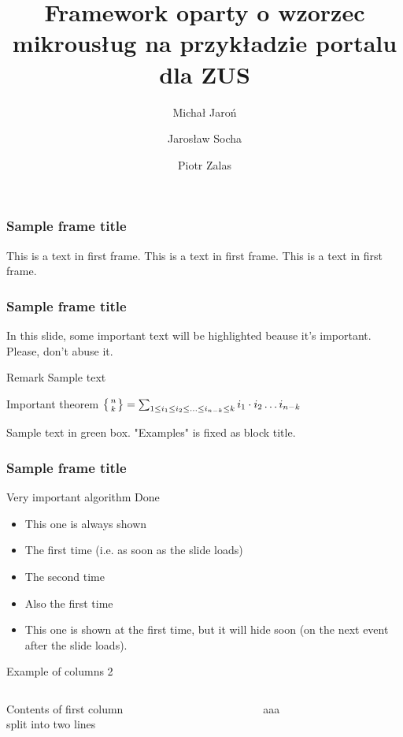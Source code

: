 \documentclass{beamer}
\title[ZPP] %
{Framework oparty o wzorzec mikrousług na przykładzie portalu dla ZUS}
\subtitle{}
\author[Jaroń, Socha, Zalas] %
{Michał Jaroń \and Jarosław Socha \and Piotr Zalas}
\institute[MIMUW] %
{
}
\date[9 czerwca 2017] %
{}
\begin{document}
\frame{\titlepage}
 
\begin{frame}
\frametitle{Sample frame title}
This is a text in first frame. This is a text in first frame. This is a text in first frame.
\end{frame}
 
\begin{frame}
\frametitle{Sample frame title}
 
In this slide, some important text will be
\alert{highlighted} beause it's important.
Please, don't abuse it.
 
\begin{block}{Remark}
Sample text
\end{block}
 
\begin{alertblock}{Important theorem}
$\left\{{n}\atop{k}\right\} = %
\sum_{1\le i_1\le i_2 \le \ldots \le i_{n-k}\le k} %
i_1\cdot i_2\dots i_{n-k}$ %
\end{alertblock}
 
\begin{examples}
Sample text in green box. "Examples" is fixed as block title.
\end{examples}
\end{frame}

\begin{frame}[fragile]
\frametitle{Sample frame title}
 
Very important algorithm
Done

\end{frame}

\begin{frame}
\begin{itemize}
	\item This one is always shown
	\item<1-> The first time (i.e. as soon as the slide loads)
	\item<2-> The second time
	\item<1-> Also the first time
	\item<1-1> {This one is shown at the first time, but it will hide soon (on the next event after the slide loads).}
\end{itemize}
\end{frame}

\begin{frame}[fragile]{Example of columns 2}
	\begin{columns}[T] %
		\begin{column}[T]{5cm} %
			Contents of first column \\ split into two lines
		\end{column}
		\begin{column}[T]{5cm} %
aaa
		\end{column}
	\end{columns}
\end{frame}
\end{document}
